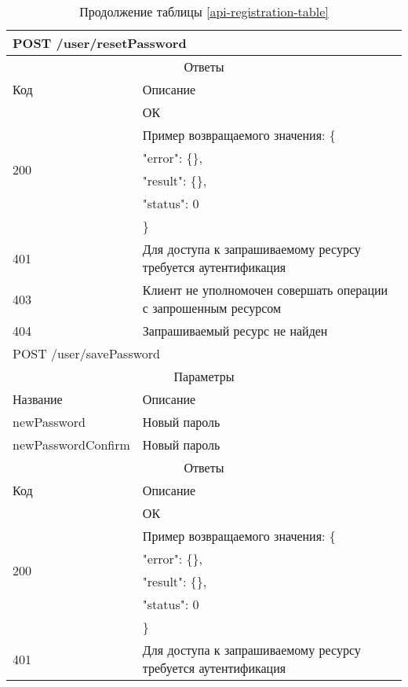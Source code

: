 \begin{table}[H]
  \caption*{Продолжение таблицы \ref{api-registration-table}}
  \begin{tabular}{|p{6cm}|p{10cm}|}
  \hline \multicolumn{2}{|l|}{POST /user/resetPassword} \\
  \hline \multicolumn{2}{|c|}{Ответы} \\
  \hline Код & Описание \\
  \hline \multirow{6}{=}{200} & ОК \\
   & Пример возвращаемого значения: \{ \\
   & "error": \{\}, \\
   & "result": \{\}, \\
   & "status": 0 \\
   & \} \\
  \hline 401 & Для доступа к запрашиваемому ресурсу требуется аутентификация \\
  \hline 403 & Клиент не уполномочен совершать операции с запрошенным ресурсом \\
  \hline 404 & Запрашиваемый ресурс не найден \\
  \hline \multicolumn{2}{|l|}{POST /user/savePassword} \\
  \hline \multicolumn{2}{|c|}{Параметры} \\
  \hline Название & Описание \\
  \hline newPassword & Новый пароль \\
  \hline newPasswordConfirm & Новый пароль \\
  \hline \multicolumn{2}{|c|}{Ответы} \\
  \hline Код & Описание \\
  \hline \multirow{6}{=}{200} & ОК \\
   & Пример возвращаемого значения: \{ \\
   & "error": \{\}, \\
   & "result": \{\}, \\
   & "status": 0 \\
   & \} \\
  \hline 401 & Для доступа к запрашиваемому ресурсу требуется аутентификация \\
  \hline
  \end{tabular}
\end{table}
